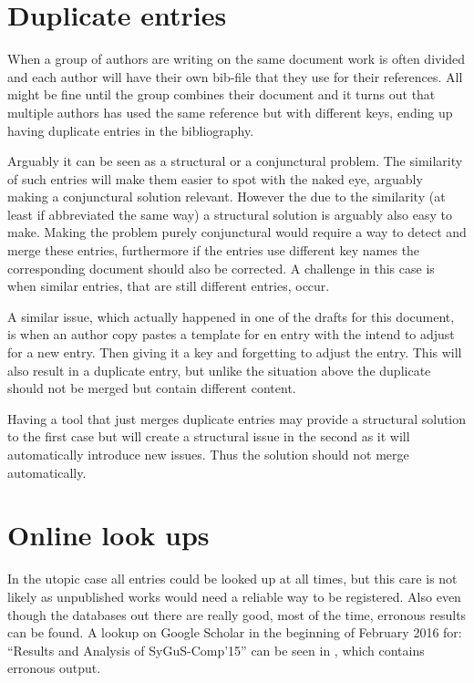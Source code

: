 \section{Duplicate entries}
\label{sec:problems_duplicates}

When a group of authors are writing on the same document work is often
divided and each author will have their own bib-file that they use for
their references.  All might be fine until the group combines their
document and it turns out that multiple authors has used the same
reference but with different keys, ending up having duplicate entries
in the bibliography.

Arguably it can be seen as a structural or a conjunctural problem.
The similarity of such entries will make them easier to spot with the
naked eye, arguably making a conjunctural solution relevant.  However
the due to the similarity (at least if abbreviated the same way) a
structural solution is arguably also easy to make.  Making the problem
purely conjunctural would require a way to detect and merge these
entries, furthermore if the entries use different key names the
corresponding document should also be corrected. A challenge in this
case is when similar entries, that are still different entries, occur.

A similar issue, which actually happened in one of the drafts for this
document, is when an author copy pastes a template for en entry with
the intend to adjust for a new entry.  Then giving it a key and
forgetting to adjust the entry.  This will also result in a duplicate
entry, but unlike the situation above the duplicate should not be
merged but contain different content.

Having a tool that just merges duplicate entries may provide a
structural solution to the first case but will create a structural
issue in the second as it will automatically introduce new issues.
Thus the solution should not merge automatically.


\section{Online look ups}
\label{sec:problems_look_ups}

In the utopic case all entries could be looked up at all times, but
this care is not likely as unpublished works would need a reliable way
to be registered.  Also even though the databases out there are really
good, most of the time, erronous results can be found.  A lookup on
Google Scholar in the beginning of February 2016 for: ``Results and
Analysis of SyGuS-Comp’15'' can be seen in
, which contains erronous output.


